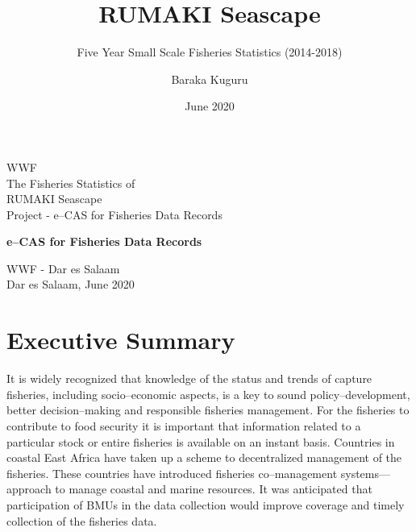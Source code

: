 \documentclass[
  12pt,
  a4paper,
  oneside]{book}
\title{RUMAKI Seascape}
\subtitle{Five Year Small Scale Fisheries Statistics (2014-2018)}
\author{Baraka Kuguru}
\date{June 2020}
\begin{document}
\maketitle

\begin{titlepage}
\vspace * {-2.5cm}	
	WWF\\
	The Fisheries Statistics of\\
	RUMAKI Seascape\\
	Project - e--CAS for Fisheries Data Records
	
\begin{center}

\vspace * {5cm}
\huge \textbf{e--CAS for Fisheries Data Records}

%
%


\vspace * {2cm}

\large
WWF - Dar es Salaam\\ 

\large
Dar es Salaam, June 2020\\ 


\end{center}


\end{titlepage}

{
\hypersetup{linkcolor=}
\setcounter{tocdepth}{1}
\tableofcontents
}
\listoftables
\listoffigures
{}
\hypertarget{executive-summary}{%
\chapter*{Executive Summary}\label{executive-summary}}

It is widely recognized that knowledge of the status and trends of capture fisheries, including socio--economic aspects, is a key to sound policy--development, better decision--making and responsible fisheries management. For the fisheries to contribute to food security it is important that information related to a particular stock or entire fisheries is available on an instant basis. Countries in coastal East Africa have taken up a scheme to decentralized management of the fisheries. These countries have introduced fisheries co--management systems---approach to manage coastal and marine resources. It was anticipated that participation of BMUs in the data collection would improve coverage and timely collection of the fisheries data.
\end{document}
